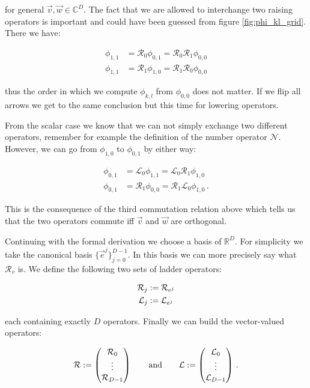 for general $\vec{v}, \vec{w} \in \mathbb{C}^D$. The fact that we are allowed to
interchange two raising operators is important and could have been guessed from
figure \ref{fig:phi_kl_grid}. There we have:

\begin{align*}
  \phi_{1,1} & = \mathcal{R}_0 \phi_{0,1} = \mathcal{R}_0 \mathcal{R}_1 \phi_{0,0} \\
  \phi_{1,1} & = \mathcal{R}_1 \phi_{1,0} = \mathcal{R}_1 \mathcal{R}_0 \phi_{0,0}
\end{align*}

thus the order in which we compute $\phi_{k,l}$ from $\phi_{0,0}$ does not matter.
If we flip all arrows we get to the same conclusion but this time for lowering
operators.

From the scalar case we know that we can not simply exchange two different
operators, remember for example the definition of the number operator $\mathcal{N}$.
However, we can go from $\phi_{1,0}$ to $\phi_{0,1}$ by either way:

\begin{align*}
  \phi_{0,1} & = \mathcal{L}_0 \phi_{1,1} = \mathcal{L}_0 \mathcal{R}_1 \phi_{1,0} \\
  \phi_{0,1} & = \mathcal{R}_1 \phi_{0,0} = \mathcal{R}_1 \mathcal{L}_0 \phi_{1,0} \,.
\end{align*}

This is the consequence of the third commutation relation above which tells us
that the two operators commute iff $\vec{v}$ and $\vec{w}$ are orthogonal.

Continuing with the formal derivation we choose a basis of $\mathbb{R}^D$. For
simplicity we take the canonical basis $\{\vec{e}^j\}_{j=0}^{D-1}$. In this basis
we can more precisely say what $\mathcal{R}_v$ is. We define the following two
sets of ladder operators:

\begin{align}
  \mathcal{R}_j & := \mathcal{R}_{e^j} \\
  \mathcal{L}_j & := \mathcal{L}_{e^j}
\end{align}

each containing exactly $D$ operators. Finally we can build the vector-valued
operators:

\begin{equation} \label{eq:raising_ops_Dd_vectorial}
  \mathcal{R} :=
  \begin{pmatrix}
    \mathcal{R}_0 \\
    \vdots \\
    \mathcal{R}_{D-1}
  \end{pmatrix}
  \qquad \text{and} \qquad
  \mathcal{L} :=
  \begin{pmatrix}
    \mathcal{L}_0 \\
    \vdots \\
    \mathcal{L}_{D-1}
  \end{pmatrix} \,.
\end{equation}

